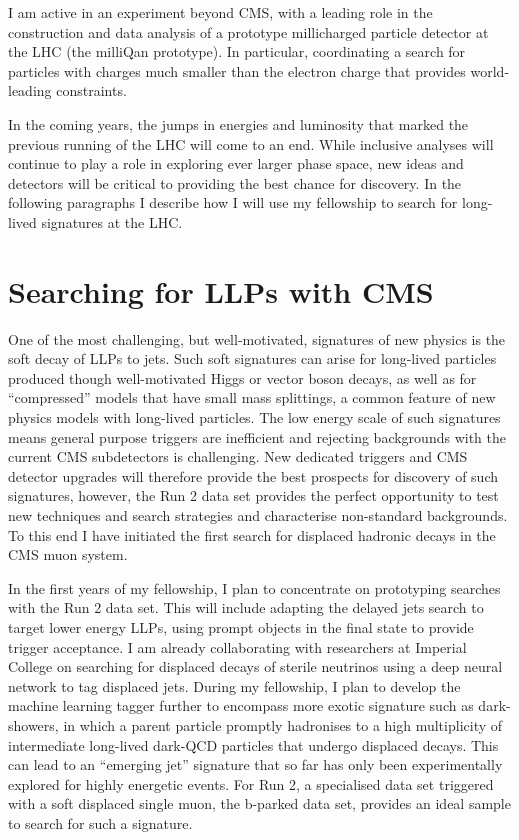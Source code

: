 \documentclass[11pt,twocolumn]{article}
\theoremstyle{plain} \numberwithin{equation}{section}
\theoremstyle{definition}
\begin{document}
I am active in an experiment beyond CMS, with a leading 
role in the construction and data analysis of a prototype 
millicharged particle detector
at the LHC (the milliQan prototype). In particular,
coordinating a search for particles with charges much
smaller than the electron charge
that provides world-leading constraints. 

In the coming years, the jumps in energies and luminosity that marked the previous running of the 
LHC will come to an end. While inclusive analyses will continue to play a role in 
exploring ever larger phase space, new ideas and detectors will be critical to 
providing the best chance for discovery. In the following paragraphs I describe
how I will use my fellowship to search for long-lived signatures at the LHC.

\section*{Searching for LLPs with CMS}

One of the most challenging, but well-motivated, signatures
of new physics is the soft decay of LLPs to jets. Such soft signatures can 
arise for long-lived particles produced though
well-motivated Higgs or vector boson decays, as well as for ``compressed'' models 
that have small mass splittings, a common 
feature of new physics models with long-lived particles. 
The low energy scale of such signatures means general purpose triggers
are inefficient and rejecting backgrounds with the current CMS subdetectors 
is challenging. New dedicated triggers and CMS detector upgrades will 
therefore provide the best prospects
for discovery of such signatures, however, the Run 2 data set provides
the perfect opportunity to test new techniques and search strategies
and characterise non-standard backgrounds. To this end I have initiated the 
first search for displaced hadronic decays in the CMS muon system.

In the first years of my fellowship, I plan to concentrate on prototyping 
searches with the Run 2 data set. This will include adapting the delayed jets search
to target lower energy LLPs, using prompt objects
in the final state to provide trigger acceptance. I am already collaborating with 
researchers at Imperial College on 
searching for displaced decays of sterile neutrinos
using a deep neural network to tag displaced jets. During my fellowship, I plan to develop
the machine learning tagger further to encompass more exotic signature such as dark-showers, in
which a parent particle promptly hadronises to a high 
multiplicity of intermediate long-lived dark-QCD particles that undergo displaced decays. 
This can lead to an ``emerging jet'' signature that so far has only
been experimentally explored for highly energetic events. For Run 2, a specialised data set triggered
with a soft displaced single muon, the b-parked data set, provides an ideal sample to search for
such a signature.
\end{document}
